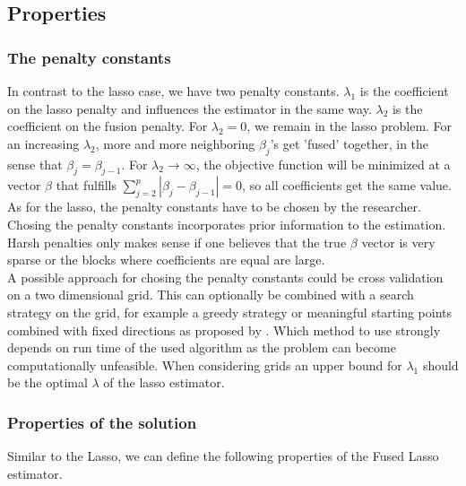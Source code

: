 \documentclass{article}
\theoremstyle{definition}
\begin{document}
	
\subsection{Properties}

\subsubsection{The penalty constants} \label{subsec: penalties}
In contrast to the lasso case, we have two penalty constants. $\lambda_1$ is the coefficient on the lasso penalty and influences the estimator in the same way. $\lambda_2$ is the coefficient on the fusion penalty.  For $\lambda_2=0$, we remain in the lasso problem. For an increasing $\lambda_2$, more and more neighboring $\beta_j$'s get 'fused' together, in the sense that $\beta_j=\beta_{j-1}$. For $\lambda_2\to\infty$, the objective function will be minimized at a vector $\beta$ that fulfills $\sum_{j=2}^p|\beta_j- \beta_{j-1}|=0$, so all coefficients get the same value.\\
As for the lasso, the penalty constants have to be chosen by the researcher.
Chosing the penalty constants incorporates prior information to the estimation. Harsh penalties only makes sense if one believes that the true $\beta$ vector is very sparse or the blocks where coefficients are equal are large. \\
A possible approach for chosing the penalty constants could be cross validation on a two dimensional grid. This can optionally be combined with a search strategy on the grid, for example a greedy strategy or meaningful starting points combined with fixed directions as proposed by \citep{fused}. Which method to use strongly depends on run time of the used algorithm as the problem can become computationally unfeasible. 
When considering grids an upper bound for $\lambda_1$ should be the optimal $\lambda$ of the lasso estimator.

\subsubsection{Properties of the solution}

Similar to the Lasso, we can define the following properties of the Fused Lasso estimator.
\end{document}
